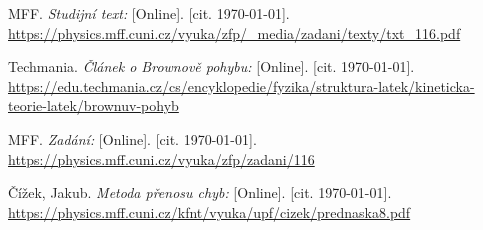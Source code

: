 
\begin{thebibliography}{9}
 MFF. \emph{Studijní text:} [Online]. [cit. \today]. \newline \url{https://physics.mff.cuni.cz/vyuka/zfp/_media/zadani/texty/txt_116.pdf}

 Techmania. \emph{Článek o Brownově pohybu:} [Online]. [cit. \today]. \newline \url{https://edu.techmania.cz/cs/encyklopedie/fyzika/struktura-latek/kineticka-teorie-latek/brownuv-pohyb}

 MFF. \emph{Zadání:} [Online]. [cit. \today]. \newline \url{https://physics.mff.cuni.cz/vyuka/zfp/zadani/116}

 Čížek, Jakub. \emph{Metoda přenosu chyb:} [Online]. [cit. \today]. \newline \url{https://physics.mff.cuni.cz/kfnt/vyuka/upf/cizek/prednaska8.pdf}

\end{thebibliography}
